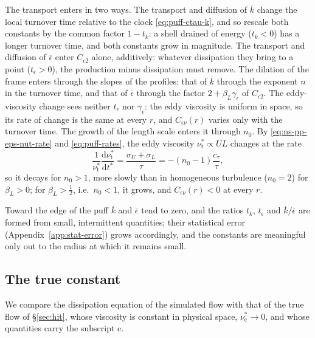 \documentclass{article}
\begin{document}
\par
The transport enters in two ways. The transport and diffusion of
$\overline{k}$ change the local turnover time relative to the clock
\eqref{eq:puff-ctau-k}, and so rescale both constants by the common factor
$1 - t_k$: a shell drained of energy ($t_k < 0$) has a longer turnover time,
and both constants grow in magnitude. The transport and diffusion of
$\overline{\epsilon}$ enter $C_{\epsilon 2}$ alone, additively: whatever
dissipation they bring to a point ($t_\epsilon > 0$), the production minus
dissipation must remove. The dilation of the frame enters through the slopes
of the profiles: that of $\overline{k}$ through the exponent $n$ in the
turnover time, and that of $\overline{\epsilon}$ through the factor
$2 + \beta_L \gamma_\epsilon$ of $C_{\epsilon 2}$. The eddy-viscosity change
sees neither $t_\epsilon$ nor $\gamma_\epsilon$: the eddy viscosity is uniform
in space, so its rate of change is the same at every $r$, and
$C_{\epsilon\nu}(r)$ varies only with the turnover time. The growth of the
length scale enters it through $n_0$. By \eqref{eq:ns-pp-eps-nut-rate} and
\eqref{eq:puff-rates}, the eddy viscosity $\nu_{\mathrm{t}}^* \propto UL$
changes at the rate
\begin{equation*}
  \frac{1}{\nu_{\mathrm{t}}^*}\frac{\mathrm{d}\nu_{\mathrm{t}}^*}{\mathrm{d}t^*}
  = \frac{\sigma_U + \sigma_L}{\tau}
  = -\left( n_0 - 1 \right) \frac{c_\tau}{\tau} ,
\end{equation*}
so it decays for $n_0 > 1$, more slowly than in homogeneous turbulence
($n_0 = 2$) for $\beta_L > 0$; for $\beta_L > \tfrac12$, i.e.\ $n_0 < 1$, it
grows, and $C_{\epsilon\nu}(r) < 0$ at every $r$.
\par
Toward the edge of the puff $\overline{k}$ and $\overline{\epsilon}$ tend to
zero, and the ratios $t_k$, $t_\epsilon$ and $\overline{k}/\overline{\epsilon}$
are formed from small, intermittent quantities; their statistical error
(Appendix~\ref{app:stat-error}) grows accordingly, and the constants are
meaningful only out to the radius at which it remains small.

\subsection{The true constant}\label{ssec:puff-ceps2c}
We compare the dissipation equation of the simulated flow with that of the
true flow of \S\ref{sec:hit}, whose viscosity is constant in physical space,
$\nu_{\mathrm{c}}^* \to 0$, and whose quantities carry the subscript
$\mathrm{c}$.
\end{document}
